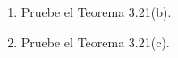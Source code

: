 \item 
\begin{enumerate}
        \item[(a)] Pruebe el Teorema 3.21(b).
        \item[(b)] Pruebe el Teorema 3.21(c).
    \end{enumerate}
